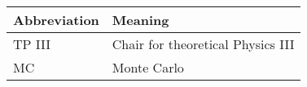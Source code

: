 \noindent\\\\

\begin{tabular}[h]{p{3cm}|l}
	Abbreviation & Meaning\\
	\hline
	TP III & Chair for theoretical Physics III\\
	MC & Monte Carlo\\
\end{tabular}\\\\

\newpage